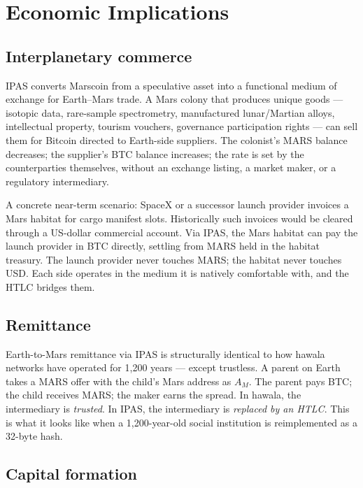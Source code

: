 \documentclass[11pt]{article}
\begin{document}
\section{Economic Implications}
\label{sec:economics}

\subsection{Interplanetary commerce}

IPAS converts Marscoin from a speculative asset into a functional medium of exchange for Earth--Mars trade. A Mars colony that produces unique goods --- isotopic data, rare-sample spectrometry, manufactured lunar/Martian alloys, intellectual property, tourism vouchers, governance participation rights --- can sell them for Bitcoin directed to Earth-side suppliers. The colonist's MARS balance decreases; the supplier's BTC balance increases; the rate is set by the counterparties themselves, without an exchange listing, a market maker, or a regulatory intermediary.

A concrete near-term scenario: SpaceX or a successor launch provider invoices a Mars habitat for cargo manifest slots. Historically such invoices would be cleared through a US-dollar commercial account. Via IPAS, the Mars habitat can pay the launch provider in BTC directly, settling from MARS held in the habitat treasury. The launch provider never touches MARS; the habitat never touches USD. Each side operates in the medium it is natively comfortable with, and the HTLC bridges them.

\subsection{Remittance}

Earth-to-Mars remittance via IPAS is structurally identical to how hawala networks have operated for 1{,}200 years --- except trustless. A parent on Earth takes a MARS offer with the child's Mars address as $A_M$. The parent pays BTC; the child receives MARS; the maker earns the spread. In hawala, the intermediary is \emph{trusted}. In IPAS, the intermediary is \emph{replaced by an HTLC}. This is what it looks like when a 1{,}200-year-old social institution is reimplemented as a 32-byte hash.

\subsection{Capital formation}
\end{document}
